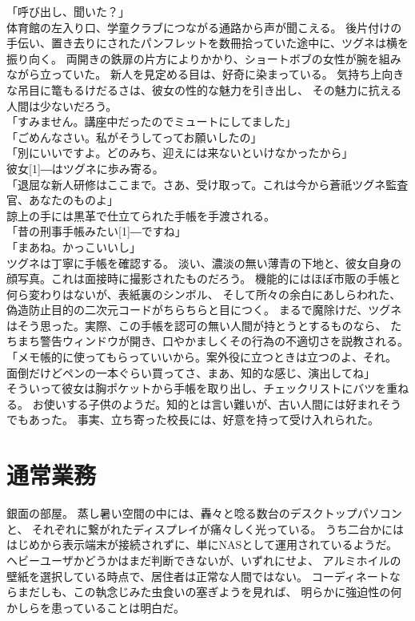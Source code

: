 \documentclass[../NenokuniMain]{subfiles}
\begin{document}
「呼び出し、聞いた？」\\
体育館の左入り口、学童クラブにつながる通路から声が聞こえる。
後片付けの手伝い、置き去りにされたパンフレットを数冊拾っていた途中に、ツグネは横を振り向く。
両開きの鉄扉の片方によりかかり、ショートボブの女性が腕を組みながら立っていた。
新人を見定める目は、好奇に染まっている。
気持ち上向きな吊目に篭もるけだるさは、彼女の性的な魅力を引き出し、
その魅力に抗える人間は少ないだろう。\\
「すみません。講座中だったのでミュートにしてました」\\
「ごめんなさい。私がそうしてってお願いしたの」\\
「別にいいですよ。どのみち、迎えには来ないといけなかったから」\\
彼女\scalebox{2}[1]{―}はツグネに歩み寄る。\\
「退屈な新人研修はここまで。さあ、受け取って。これは今から蒼祇ツグネ監査官、あなたのものよ」\\
諒上の手には黒革で仕立てられた手帳を手渡される。\\
「昔の刑事手帳みたい\scalebox{2}[1]{―}ですね」\\
「まあね。かっこいいし」\\
ツグネは丁寧に手帳を確認する。
淡い、濃淡の無い薄青の下地と、彼女自身の顔写真。これは面接時に撮影されたものだろう。
機能的にはほぼ市販の手帳と何ら変わりはないが、表紙裏のシンボル、
そして所々の余白にあしらわれた、偽造防止目的の二次元コードがちらちらと目につく。
まるで魔除けだ、ツグネはそう思った。実際、この手帳を認可の無い人間が持とうとするものなら、
たちまち警告ウィンドウが開き、口やかましくその行為の不適切さを説教される。\\
「メモ帳的に使ってもらっていいから。案外役に立つときは立つのよ、それ。
面倒だけどペンの一本ぐらい買ってさ、まあ、知的な感じ、演出してね」\\
そういって彼女は胸ポケットから手帳を取り出し、チェックリストにバツを重ねる。
お使いする子供のようだ。知的とは言い難いが、古い人間には好まれそうでもあった。
事実、立ち寄った校長には、好意を持って受け入れられた。\\




\section{通常業務}

銀面の部屋。
蒸し暑い空間の中には、轟々と唸る数台のデスクトップパソコンと、
それぞれに繋がれたディスプレイが痛々しく光っている。
うち二台かにははじめから表示端末が接続されずに、単にNASとして運用されているようだ。
ヘビーユーザかどうかはまだ判断できないが、いずれにせよ、
アルミホイルの壁紙を選択している時点で、居住者は正常な人間ではない。
コーディネートならまだしも、この執念じみた虫食いの塞ぎようを見れば、
明らかに強迫性の何かしらを患っていることは明白だ。
\end{document}
